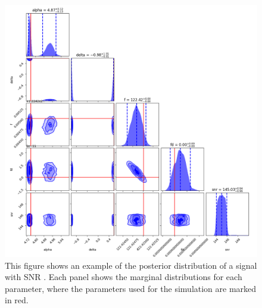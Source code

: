 \begin{figure}[pt]

    \centering
    \includegraphics[width=\linewidth]{C5_parameter/cornerplot.png}
    \caption[KDE of likelihood in different \gls{SNR} ranges]{This figure shows an example of the posterior distribution of a signal with \gls{SNR} . Each panel shows the marginal distributions for each parameter, where the parameters used for the simulation are marked in red.}
    \label{par_est:results:example_posterier}
    
\end{figure}
%

